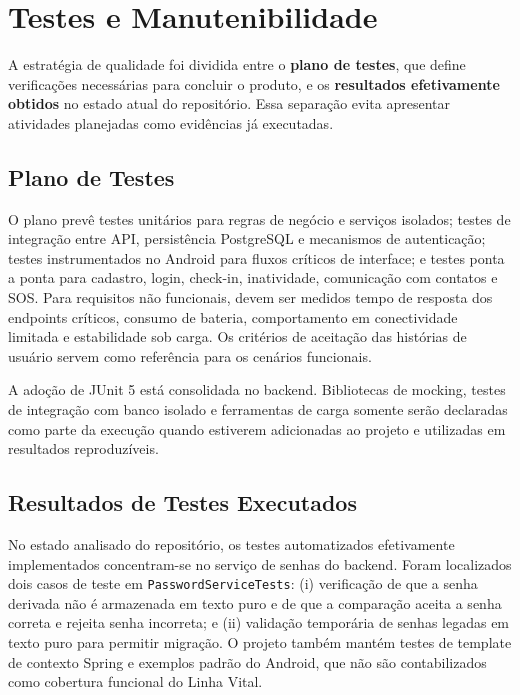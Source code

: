 \section{Testes e Manutenibilidade}

A estratégia de qualidade foi dividida entre o \textbf{plano de testes}, que define verificações necessárias para concluir o produto, e os \textbf{resultados efetivamente obtidos} no estado atual do repositório. Essa separação evita apresentar atividades planejadas como evidências já executadas.

\subsection{Plano de Testes}

O plano prevê testes unitários para regras de negócio e serviços isolados; testes de integração entre API, persistência PostgreSQL e mecanismos de autenticação; testes instrumentados no Android para fluxos críticos de interface; e testes ponta a ponta para cadastro, login, check-in, inatividade, comunicação com contatos e SOS. Para requisitos não funcionais, devem ser medidos tempo de resposta dos endpoints críticos, consumo de bateria, comportamento em conectividade limitada e estabilidade sob carga. Os critérios de aceitação das histórias de usuário servem como referência para os cenários funcionais.

A adoção de JUnit 5 está consolidada no backend. Bibliotecas de mocking, testes de integração com banco isolado e ferramentas de carga somente serão declaradas como parte da execução quando estiverem adicionadas ao projeto e utilizadas em resultados reproduzíveis.

\subsection{Resultados de Testes Executados}

No estado analisado do repositório, os testes automatizados efetivamente implementados concentram-se no serviço de senhas do backend. Foram localizados dois casos de teste em \texttt{PasswordServiceTests}: (i) verificação de que a senha derivada não é armazenada em texto puro e de que a comparação aceita a senha correta e rejeita senha incorreta; e (ii) validação temporária de senhas legadas em texto puro para permitir migração. O projeto também mantém testes de template de contexto Spring e exemplos padrão do Android, que não são contabilizados como cobertura funcional do Linha Vital.

